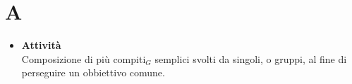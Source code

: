 \chapter{A} \label{A}
\begin{itemize}
		\item \textbf{Attività}\\
		Composizione di più compiti$_G$ semplici svolti da singoli, o gruppi, al fine di perseguire un obbiettivo comune.
		
	\end{itemize}